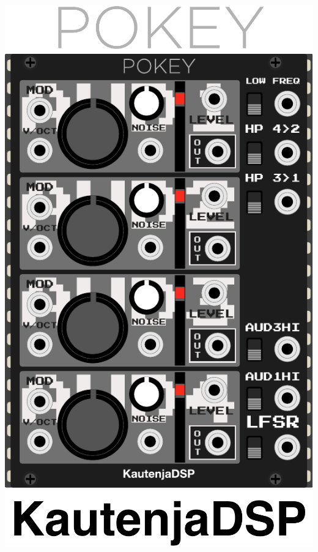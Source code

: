\documentclass[12pt,a4paper]{article}
\begin{document}

\thispagestyle{empty}
\vspace*{\fill}
\begin{center}
\includegraphics{POKEY-Logo}
\linebreak\linebreak\linebreak\linebreak
\includegraphics{POKEY-Module}
\linebreak\linebreak\linebreak\linebreak
\includegraphics{KautenjaDSP}
\end{center}
\vspace*{\fill}
\clearpage
\end{document}
